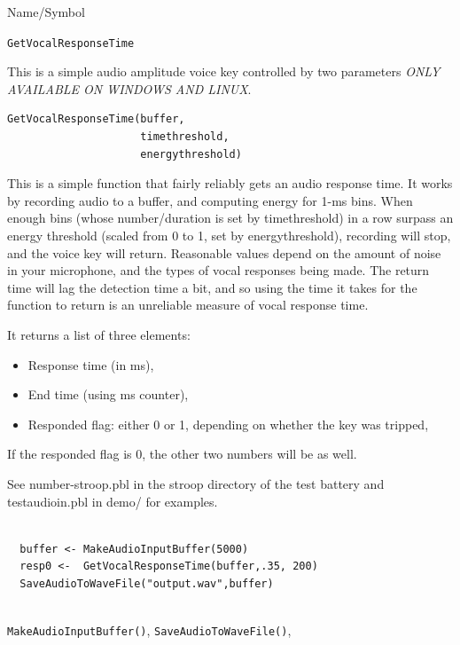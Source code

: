 \begin{desc}{Name/Symbol}
\item[Name/Symbol]	\verb+GetVocalResponseTime+

\item[Description] This is a simple audio amplitude voice key controlled by two parameters  \emph{ONLY AVAILABLE ON WINDOWS AND LINUX}.

\item[Usage]
\begin{verbatim}
GetVocalResponseTime(buffer, 
                     timethreshold,
                     energythreshold)
\end{verbatim}
This is a simple function that fairly reliably gets an audio response time.  It works by recording audio to a buffer, and computing energy for 1-ms bins.  When enough bins (whose number/duration is set by timethreshold) in a row surpass an energy threshold (scaled from 0 to 1, set by energythreshold), recording will stop, and the voice key will return.  Reasonable values depend on the amount of noise in your microphone, and the types of vocal responses being made.  The return time will lag the detection time a bit, and so using the time it takes for the function to return is an unreliable measure of vocal response time.


It returns a list of three elements:

\begin{itemize}
\item Response time (in ms),
\item End time (using ms counter),
\item Responded flag: either 0 or 1, depending on whether the key was tripped,
\end{itemize}

If the responded flag is 0, the other two numbers will be as well.

See number-stroop.pbl in the stroop directory of the test battery and testaudioin.pbl in demo/ for examples.


\item[Example]	
\begin{verbatim}

  buffer <- MakeAudioInputBuffer(5000)
  resp0 <-  GetVocalResponseTime(buffer,.35, 200)
  SaveAudioToWaveFile("output.wav",buffer)
  
\end{verbatim}
\item[See Also] 	\verb+MakeAudioInputBuffer()+, \verb+SaveAudioToWaveFile()+,
\end{desc}




